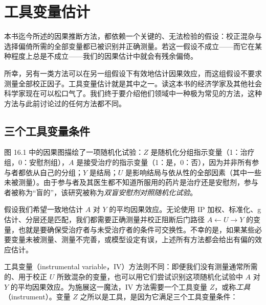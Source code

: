 \chapter{工具变量估计}

本书迄今所述的因果推断方法，都依赖一个关键的、无法检验的假设：校正混杂与选择偏倚所需的全部变量都已被识别并正确测量。若这一假设不成立——而它在某种程度上总是不成立——我们的因果估计中就会有残余偏倚。

所幸，另有一类方法可以在另一组假设下有效地估计因果效应，而这组假设不要求测量全部校正因子。工具变量估计就是其中之一。读这本书的经济学家及其他社会科学家现在可以松口气了。我们终于要介绍他们领域中一种极为常见的方法，这种方法与此前讨论过的任何方法都不同。

\section{三个工具变量条件}

图 16.1 中的因果图描绘了一项随机化试验：$Z$ 是随机化分组指示变量（1：治疗组，0：安慰剂组），$A$ 是接受治疗的指示变量（1：是，0：否），因为并非所有参与者都依从自己的分组；$Y$ 是结局；$U$ 是影响结局与依从性的全部因素（其中一些未被测量）。由于参与者及其医生都不知道所服用的药片是治疗还是安慰剂，参与者被称为“盲的”，该研究被称为\emph{双盲安慰剂对照随机化试验}。

\begin{figure}[!ht]
\centering
{}
\caption{}
\label{fig:16.1}
\end{figure}

假设我们希望一致地估计 $A$ 对 $Y$ 的平均因果效应。无论使用 IP 加权、标准化、g 估计、分层还是匹配，我们都需要正确测量并校正阻断后门路径 $A\leftarrow U\rightarrow Y$ 的变量，也就是要确保受治疗者与未受治疗者的条件可交换性。不幸的是，如果某些必要变量未被测量、测量不完善，或模型设定有误，上述所有方法都会给出有偏的效应估计。

工具变量（instrumental variable，IV）方法则不同：即便我们没有测量通常所需的、用于校正 $U$ 所致混杂的变量，也可以用它们尝试识别这项随机化试验中 $A$ 对 $Y$ 的平均因果效应。为施展这一魔法，IV 方法需要一个工具变量 $Z$，或称\emph{工具}（instrument）。变量 $Z$ 之所以是工具，是因为它满足三个工具变量条件：


